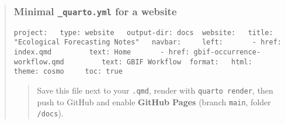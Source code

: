 \documentclass[
  letterpaper,
  DIV=11,
  numbers=noendperiod]{scrartcl}
\begin{document}
\begin{tcolorbox}
\begin{quote}
\subsubsection{\texorpdfstring{Minimal \texttt{\_quarto.yml} for a
website}{Minimal \_quarto.yml for a website}}\label{minimal-_quarto.yml-for-a-website}

\begin{verbatim}
project:   type: website   output-dir: docs  website:   title: "Ecological Forecasting Notes"   navbar:     left:       - href: index.qmd         text: Home       - href: gbif-occurrence-workflow.qmd         text: GBIF Workflow  format:   html:     theme: cosmo     toc: true 
\end{verbatim}

\begin{quote}
Save this file next to your \texttt{.qmd}, render with
\texttt{quarto\ render}, then push to GitHub and enable \textbf{GitHub
Pages} (branch \texttt{main}, folder \texttt{/docs}).
\end{quote}
\end{quote}

\end{tcolorbox}
\end{document}
